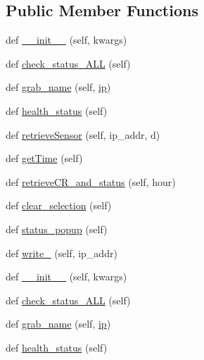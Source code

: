 \subsection*{Public Member Functions}
\begin{DoxyCompactItemize}
\item 
def \hyperlink{classTestingGUI_1_1Health_acf40a31363f46003573ea00664734fc3}{\+\_\+\+\_\+init\+\_\+\+\_\+} (self, kwargs)
\item 
def \hyperlink{classTestingGUI_1_1Health_aa382e2bc40e918613d90dbd819974420}{check\+\_\+status\+\_\+\+A\+LL} (self)
\item 
def \hyperlink{classTestingGUI_1_1Health_a236b797764a726c3fe2d68f2fabaceb8}{grab\+\_\+name} (self, \hyperlink{classTestingGUI_1_1Health_a2c897cb32dd28d657ac3f22c64a14543}{ip})
\item 
def \hyperlink{classTestingGUI_1_1Health_ac36ce2de8d9aa5f3b687da2f836f0b3d}{health\+\_\+status} (self)
\item 
def \hyperlink{classTestingGUI_1_1Health_afde04eeef599765553cce6069cff429e}{retrieve\+Sensor} (self, ip\+\_\+addr, d)
\item 
def \hyperlink{classTestingGUI_1_1Health_ad38efcab164d7bbb4ec16c2086dc7760}{get\+Time} (self)
\item 
def \hyperlink{classTestingGUI_1_1Health_a3a6e2fca0c7a691527b14c79b388f6fd}{retrieve\+C\+R\+\_\+and\+\_\+status} (self, hour)
\item 
def \hyperlink{classTestingGUI_1_1Health_a1e3b9ff5f630c5f6d47bfefe26cfb39b}{clear\+\_\+selection} (self)
\item 
def \hyperlink{classTestingGUI_1_1Health_a06c77fae7dd08337985a3420a2cdbc81}{status\+\_\+popup} (self)
\item 
def \hyperlink{classTestingGUI_1_1Health_a73ccf83145b4adf9452f85a061c23dc9}{write\+\_\+} (self, ip\+\_\+addr)
\item 
def \hyperlink{classTestingGUI_1_1Health_acf40a31363f46003573ea00664734fc3}{\+\_\+\+\_\+init\+\_\+\+\_\+} (self, kwargs)
\item 
def \hyperlink{classTestingGUI_1_1Health_aa382e2bc40e918613d90dbd819974420}{check\+\_\+status\+\_\+\+A\+LL} (self)
\item 
def \hyperlink{classTestingGUI_1_1Health_a236b797764a726c3fe2d68f2fabaceb8}{grab\+\_\+name} (self, \hyperlink{classTestingGUI_1_1Health_a2c897cb32dd28d657ac3f22c64a14543}{ip})
\item 
def \hyperlink{classTestingGUI_1_1Health_ac36ce2de8d9aa5f3b687da2f836f0b3d}{health\+\_\+status} (self)

\end{DoxyCompactItemize}
